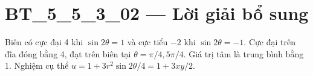 \documentclass[10pt,a4paper]{article}
\begin{document}
\section*{BT\_5\_5\_3\_02 — Lời giải bổ sung}
Biên có cực đại 4 khi $\sin2\theta=1$ và cực tiểu $-2$ khi $\sin2\theta=-1$. Cực đại trên đĩa đóng bằng 4, đạt trên biên tại $\theta=\pi/4,5\pi/4$. Giá trị tâm là trung bình bằng 1. Nghiệm cụ thể $u=1+3r^2\sin2\theta/4=1+3xy/2$.
\end{document}
